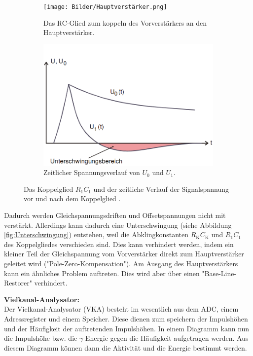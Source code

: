\begin{figure}[H]
	\centering
	\begin{subfigure}[t]{0.49\linewidth}
		\texttt{[image: Bilder/Hauptverstärker.png]}
		\caption{Das RC-Glied zum koppeln des Vorverstärkers an den Hauptverstärker.}
		\label{fig:Hauptverstärker}
	\end{subfigure}
	\hfill
	\begin{subfigure}[t]{0.49\linewidth}
		\includegraphics[width=\textwidth]{Bilder/Unterschwingung.png}
		\caption{Zeitlicher Spannungsverlauf von $U_0$ und $U_1$.}
		\label{fig:Unterschwingung}
	\end{subfigure}
  \caption{Das Koppelglied $R_1C_1$ und der zeitliche Verlauf der Signalspannung vor und nach dem Koppelglied \cite{V18}.}
\end{figure}

Dadurch werden Gleichspannungsdriften und Offsetspannungen nicht mit verstärkt. Allerdings kann dadurch eine Unterschwingung (siehe Abbildung \eqref{fig:Unterschwingung}) entstehen, weil die Abklingkonstanten $R_\text{K}C_\text{K}$ und $R_1C_1$ des Koppelgliedes verschieden sind. Dies kann verhindert werden, indem ein kleiner Teil der Gleichspannung vom Vorverstärker direkt zum Hauptverstärker geleitet wird ("Pole-Zero-Kompensation"). Am Ausgang des Hauptverstärkers kann ein ähnliches Problem auftreten. Dies wird aber über einen "Base-Line-Restorer" verhindert.

\textbf{Vielkanal-Analysator:} \\
Der Vielkanal-Analysator (VKA) besteht im wesentlich aus dem ADC, einem Adressregister und einem Speicher. Diese dienen zum speichern der Impulshöhen und der Häufigkeit der auftretenden Impulshöhen. In einem Diagramm kann nun die Impulshöhe bzw. die $\gamma$-Energie gegen die Häufigkeit aufgetragen werden. Aus diesem Diagramm können dann die Aktivität und die Energie bestimmt werden. \\



